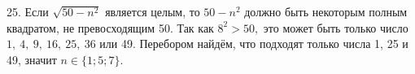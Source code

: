 25. Если $\sqrt{50-n^2}$ является целым, то $50-n^2$ должно быть некоторым полным квадратом, не превосходящим 50. Так как $8^2>50,$ это может быть только число $1,\ 4,\ 9,\ 16,\ 25,\ 36$ или 49. Перебором найдём, что подходят только числа 1, 25 и 49, значит $n\in\{1;5;7\}.$\\
